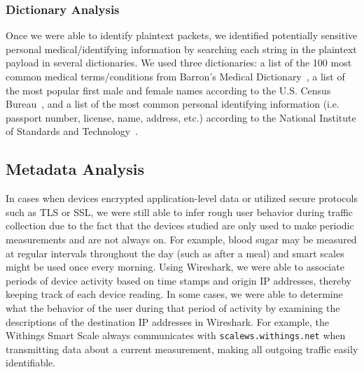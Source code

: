 \subsubsection{Dictionary Analysis}
Once we were able to identify plaintext packets, we identified potentially sensitive personal medical/identifying information by searching each string in the plaintext payload in several dictionaries. We used three dictionaries: a list of the 100 most common medical terms/conditions from Barron's Medical Dictionary~\cite{barrons}, a list of the most popular first male and female names according to the U.S. Census Bureau~\cite{names}, and a list of the most common personal identifying information (i.e. passport number, license, name, address, etc.) according to the National Institute of Standards and Technology~\cite{nist}. 

\subsection{Metadata Analysis}

In cases when devices encrypted application-level data or utilized secure
protocols such as TLS or SSL, we were still able to infer rough user behavior
during traffic collection due to the fact that the devices studied are only
used to make periodic measurements and are not always on. For example, blood
sugar may be measured at regular intervals throughout the day (such as after a
meal) and smart scales might be used once every morning. Using Wireshark, we
were able to associate periods of device activity based on time stamps and
origin IP addresses, thereby keeping track of each device reading. In some
cases, we were able to determine what the behavior of the user during that
period of activity by examining the descriptions of the destination IP
addresses in Wireshark. For example, the Withings Smart Scale always
communicates with {\tt scalews.withings.net} when transmitting data
about a current measurement, making all outgoing traffic easily identifiable.



